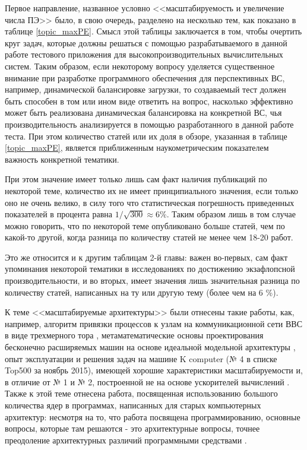  
 Первое направление, названное условно <<масштабируемость и увеличение числа ПЭ>> было, в свою очередь, разделено
 на несколько тем, как показано в таблице \ref{topic_maxPE}. Смысл этой таблицы заключается в том, чтобы очертить круг задач, которые должны решаться с помощью разрабатываемого в данной работе тестового приложения для высокопроизводительных вычислительных систем. Таким образом, если некоторому вопросу уделяется существенное внимание при разработке программного обеспечения для перспективных ВС, например, динамической балансировке загрузки, то создаваемый тест должен быть способен в том или ином виде ответить на вопрос, насколько эффективно может быть реализована динамическая балансировка на конкретной ВС, чья производительность анализируется в помощью разработанного в данной работе теста.
 При этом количество статей или их доля в обзоре, указанная в таблице  \ref{topic_maxPE}, является приближенным наукометрическим показателем важность конкретной тематики.
 
  При этом значение имеет только лишь сам факт наличия публикаций по некоторой теме, количество их не имеет принципиального значения, если только оно не очень велико, в силу того что статистическая погрешность приведенных показателей в процента равна $1/\sqrt{300} \approx 6 \%$.
  Таким образом лишь в том случае можно говорить, что по некоторой теме опубликовано больше статей, чем по какой-то другой, когда разница по количеству статей не менее чем 18-20 работ. 
  
  Это же относится и к другим таблицам 2-й главы: важен во-первых, сам факт упоминания некоторой тематики в исследованиях по достижению экзафлопсной производительности, и во вторых, имеет значения лишь значительная разница по количеству статей, написанных на ту или другую тему (более чем на 6 \%).
 \clearpage
 
 К теме <<масштабируемые архитектуры>> были отнесены такие работы, как, например, алгоритм привязки процессов к узлам на коммуникационной сети ВВС в виде трехмерного тора \cite{Kodama2014362},
 метаматематические основы проектирования бесконечно расширяемых машин на основе идеальной модельной архитектуры \cite{Anderson20151828}, опыт эксплуатации и решения задач на машине K computer (№ 4 в списке Top500 за ноябрь 2015), имеющей хорошие характеристики масштабируемости и, в отличие от № 1 и № 2, построенной не на основе ускорителей вычислений \cite{Yamamoto2014576}. Также к этой теме отнесена работа, посвященная использованию большого количества ядер в программах, написанных для старых компьютерных архитектур: несмотря на то, что работа посвящена программированию, основные вопросы, которые там решаются - это архитектурные вопросы, точнее преодоление архитектурных различий программными средствами \cite{Lohner201353}.
 
